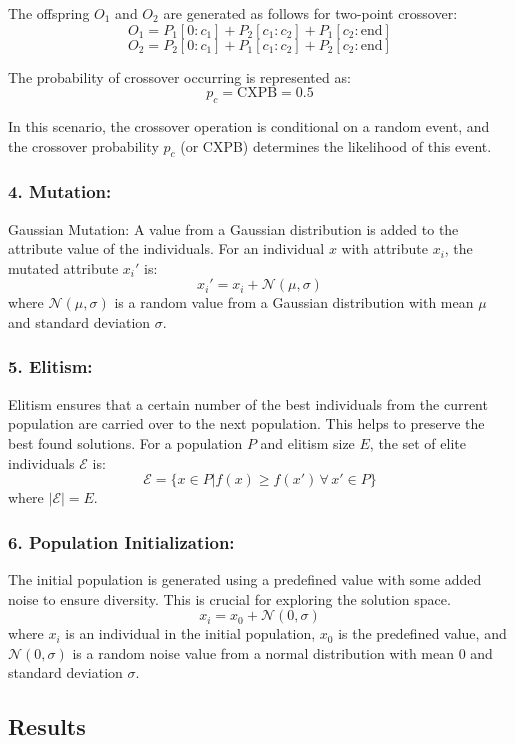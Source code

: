 The offspring \( O_1 \) and \( O_2 \) are generated as follows for two-point crossover:
\[
O_1 = P_1[0:c_1] + P_2[c_1:c_2] + P_1[c_2:\text{end}]
\]
\[
O_2 = P_2[0:c_1] + P_1[c_1:c_2] + P_2[c_2:\text{end}]
\]

The probability of crossover occurring is represented as:
\[
p_c = \text{CXPB} = 0.5
\]

In this scenario, the crossover operation is conditional on a random event, and the crossover probability \( p_c \) (or CXPB) determines the likelihood of this event.

\subsubsection{4. Mutation:}
Gaussian Mutation: A value from a Gaussian distribution is added to the attribute value of the individuals.
For an individual \( x \) with attribute \( x_i \), the mutated attribute \( x_i' \) is:
\[
x_i' = x_i + \mathcal{N}(\mu, \sigma)
\]
where \( \mathcal{N}(\mu, \sigma) \) is a random value from a Gaussian distribution with mean \( \mu \) and standard deviation \( \sigma \).

\subsubsection{5. Elitism:}
Elitism ensures that a certain number of the best individuals from the current population are carried over to the next population. This helps to preserve the best found solutions.
For a population \( P \) and elitism size \( E \), the set of elite individuals \( \mathcal{E} \) is:
\[
\mathcal{E} = \{ x \in P | f(x) \geq f(x') \, \forall \, x' \in P \}
\]
where \( |\mathcal{E}| = E \).

\subsubsection{6. Population Initialization:}
The initial population is generated using a predefined value with some added noise to ensure diversity. This is crucial for exploring the solution space.
\[
x_i = x_0 + \mathcal{N}(0, \sigma)
\]
where \( x_i \) is an individual in the initial population, \( x_0 \) is the predefined value, and \( \mathcal{N}(0, \sigma) \) is a random noise value from a normal distribution with mean 0 and standard deviation \( \sigma \).


\subsection{Results}
